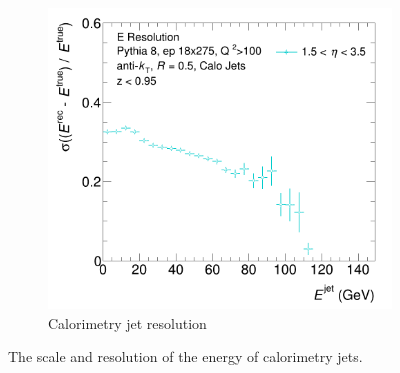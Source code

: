 \begin{figure}
\begin{subfigure}{0.4\textwidth}
        \includegraphics[width=\linewidth]{figs/jet_plots/JER_E_calo_grouped.png}
        \caption{Calorimetry jet resolution}
        \label{fig:calo_energy_resolution}
    \end{subfigure}
    \caption{The scale and resolution of the energy of calorimetry jets.}
    \label{fig:calo_energy_reso_scale}
\end{figure}




